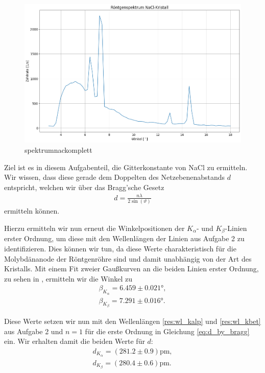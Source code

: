 \begin{figure}[H]
  \centering
  \includegraphics[width=.9\textwidth]{files/plots/spektrum_nacl_komplett.png}
  \caption{spektrumnackomplett}
  \label{fig:spektrum_nacl_komplett}
\end{figure}

Ziel ist es in diesem Aufgabenteil, die Gitterkonstante von NaCl zu ermitteln. Wir wissen, dass diese gerade dem Doppelten des Netzebenenabstands $d$ entspricht, welchen wir über das Bragg'sche Gesetz 
\begin{align}
  d = \frac{n \lambda}{2 \sin(\vartheta)}\label{eq:d_by_bragg}
\end{align}
ermitteln können.

Hierzu ermitteln wir nun erneut die Winkelpositionen der $K_{\alpha}$- und $K_{\beta}$-Linien erster Ordnung, um diese mit den Wellenlängen der Linien aus Aufgabe 2 zu identifizieren. Dies können wir tun, da diese Werte charakteristisch für die Molybdänanode der Röntgenröhre sind und damit unabhängig von der Art des Kristalls. Mit einem Fit zweier Gaußkurven an die beiden Linien erster Ordnung, zu sehen in , ermitteln wir die Winkel zu
\begin{align}
  \beta_{K_{\alpha}} = 6.459 \pm 0.021\si{\degree},\\[0.5em]
  \beta_{K_{\beta}} = 7.291 \pm 0.016\si{\degree}.
\end{align}

Diese Werte setzen wir nun mit den Wellenlängen \eqref{res:wl_kalp} und \eqref{res:wl_kbet} aus Aufgabe 2 und $n = 1$ für die erste Ordnung in Gleichung \eqref{eq:d_by_bragg} ein. Wir erhalten damit die beiden Werte für $d$:
\begin{align}
  d_{K_{\alpha}} = (281.2 \pm 0.9)\si{\pico\meter},\\[0.5em]
  d_{K_{\beta}} =(280.4 \pm 0.6)\si{\pico\meter}.
\end{align}

